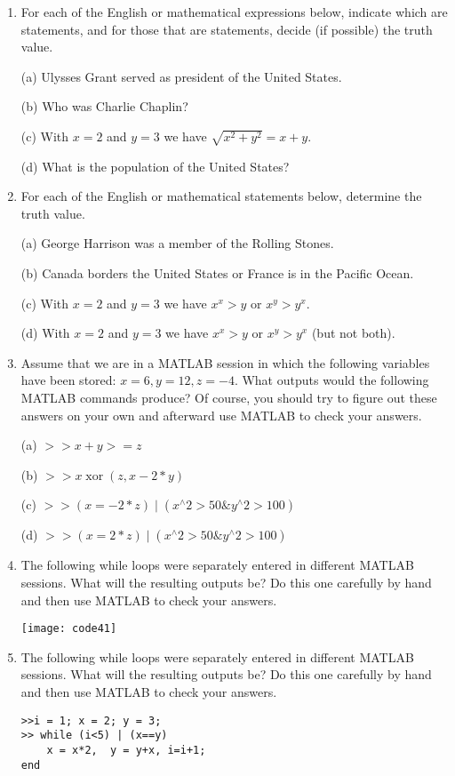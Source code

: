 \documentclass[../main.tex]{subfiles}
\begin{document}
\begin{enumerate}
\item For each of the English or mathematical expressions below, indicate which are statements, and for those that are statements, decide (if possible) the truth value.

(a) Ulysses Grant served as president of the United States.

(b) Who was Charlie Chaplin?

(c) With $x=2$ and $y=3$ we have $\sqrt{x^{2}+y^{2}}=x+y$.

(d) What is the population of the United States?

\item For each of the English or mathematical statements below, determine the truth value.

(a) George Harrison was a member of the Rolling Stones.

(b) Canada borders the United States or France is in the Pacific Ocean.

(c) With $x=2$ and $y=3$ we have $x^{x}>y$ or $x^{y}>y^{x}$.

(d) With $x=2$ and $y=3$ we have $x^{x}>y$ or $x^{y}>y^{x}$ (but not both).

\item Assume that we are in a MATLAB session in which the following variables have been stored: $x=6, y=12, z=-4$. What outputs would the following MATLAB commands produce? Of course, you should try to figure out these answers on your own and afterward use MATLAB to check your answers.

(a) $>>x+y>=z$

(b) $>>x \operatorname{xor}(z, x-2 * y)$

(c) $>>\left(x=-2 *z\right) \mid\left(x^{\wedge} 2>50  \&  y^{\wedge} 2>100\right)$

(d) $>>\left(x=2*z\right) \mid\left(x^{\wedge} 2>50 \& y^{\wedge} 2>100\right)$ 
\item The following while loops were separately entered in different MATLAB sessions. What will the resulting outputs be? Do this one carefully by hand and then use MATLAB to check your answers.

\texttt{[image: code41]}

\item The following while loops were separately entered in different MATLAB sessions. What will the resulting outputs be? Do this one carefully by hand and then use MATLAB to check your answers.\\

\begin{verbatim}
>>i = 1; x = 2; y = 3;
>> while (i<5) | (x==y)
	x = x*2,  y = y+x, i=i+1;
end
\end{verbatim}
\end{enumerate}
\end{document}
